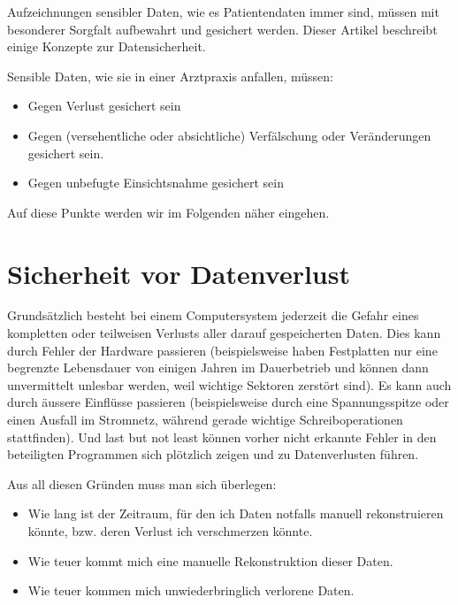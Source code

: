 %

\label{sicherheit}
Aufzeichnungen sensibler Daten, wie es Patientendaten immer sind, müssen mit besonderer Sorgfalt
aufbewahrt und gesichert werden. Dieser Artikel beschreibt einige Konzepte zur Datensicherheit.

Sensible Daten, wie sie in einer Arztpraxis anfallen, müssen:
\begin{itemize}
  \item{Gegen Verlust gesichert sein}
  \item{Gegen (versehentliche oder absichtliche) Verfälschung oder
  Veränderungen gesichert sein.}
  \item {Gegen unbefugte Einsichtsnahme gesichert sein}
\end{itemize}

Auf diese Punkte werden wir im Folgenden näher eingehen.

\section{Sicherheit vor Datenverlust}
Grundsätzlich besteht bei einem Computersystem jederzeit die Gefahr eines kompletten
oder teilweisen Verlusts aller darauf gespeicherten Daten. Dies kann durch Fehler der Hardware
passieren (beispielsweise haben Festplatten nur eine begrenzte Lebensdauer von einigen Jahren
im Dauerbetrieb und können dann unvermittelt unlesbar werden, weil wichtige Sektoren zerstört
sind). Es kann auch durch äussere Einflüsse passieren (beispielsweise durch eine Spannungsspitze
oder einen Ausfall im Stromnetz, während gerade wichtige Schreiboperationen stattfinden).
Und last but not least können vorher nicht erkannte Fehler in den beteiligten Programmen
sich plötzlich zeigen und zu Datenverlusten führen.

Aus all diesen Gründen muss man sich überlegen:
\begin{itemize}
  \item {Wie lang ist der Zeitraum, für den ich Daten notfalls manuell
  rekonstruieren könnte, bzw. deren Verlust ich verschmerzen könnte.}
  \item {Wie teuer kommt mich eine manuelle Rekonstruktion dieser Daten.}
  \item {Wie teuer kommen mich unwiederbringlich verlorene Daten.}
\end{itemize}

